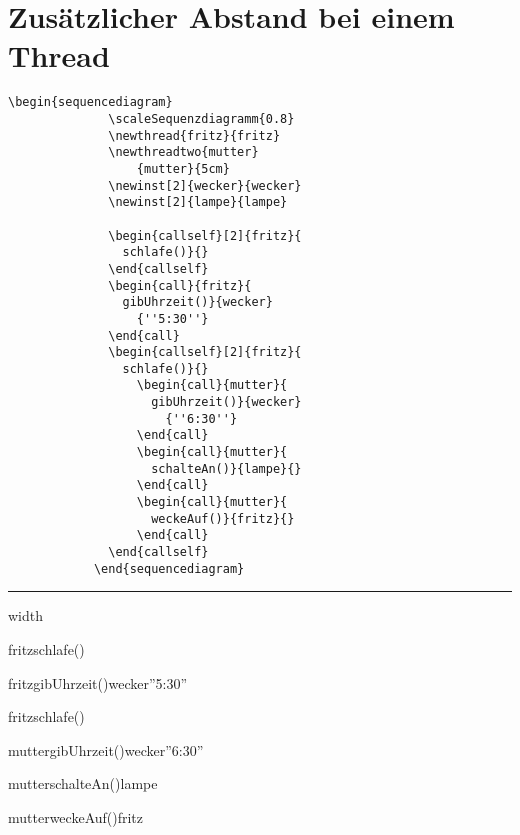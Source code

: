 \documentclass[a4paper]{scrartcl}
\begin{document}
\section*{Zusätzlicher Abstand bei einem Thread}
 \begin{lstlisting}[gobble=6,multicols=2,caption={}]
			\begin{sequencediagram}
			  \scaleSequenzdiagramm{0.8}
			  \newthread{fritz}{fritz}
			  \newthreadtwo{mutter}
				  {mutter}{5cm}
			  \newinst[2]{wecker}{wecker}
			  \newinst[2]{lampe}{lampe}
			  
			  \begin{callself}[2]{fritz}{
			    schlafe()}{}
			  \end{callself}
			  \begin{call}{fritz}{
			    gibUhrzeit()}{wecker}
			      {''5:30''}
			  \end{call}
			  \begin{callself}[2]{fritz}{
			    schlafe()}{}
			      \begin{call}{mutter}{
			        gibUhrzeit()}{wecker}
			          {''6:30''}
			      \end{call}
			      \begin{call}{mutter}{
			        schalteAn()}{lampe}{}
			      \end{call}
			      \begin{call}{mutter}{
			        weckeAuf()}{fritz}{}
			      \end{call}
			  \end{callself}
			\end{sequencediagram}
	 \end{lstlisting}
 \vspace{0.6cm}
 \hrule width \textwidth
 \vspace{1cm}
			\begin{sequencediagram}
				
				\begin{callself}[2]{fritz}{schlafe()}{}
				\end{callself}
				\begin{call}{fritz}{gibUhrzeit()}{wecker}{''5:30''}
				\end{call}
				\begin{callself}[2]{fritz}{schlafe()}{}
				\begin{call}{mutter}{gibUhrzeit()}{wecker}{''6:30''}
				\end{call}
				\begin{call}{mutter}{schalteAn()}{lampe}{}
				\end{call}
				\begin{call}{mutter}{weckeAuf()}{fritz}{}
				\end{call}
				\end{callself}
			\end{sequencediagram}
\end{document}
